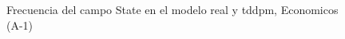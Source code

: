 \begin{figure}[H]
    \centering
    
    \caption{Frecuencia del campo State en el modelo real y tddpm, Economicos (A-1)}
    \label{frecuency-State-tddpm_mlp}
\end{figure}